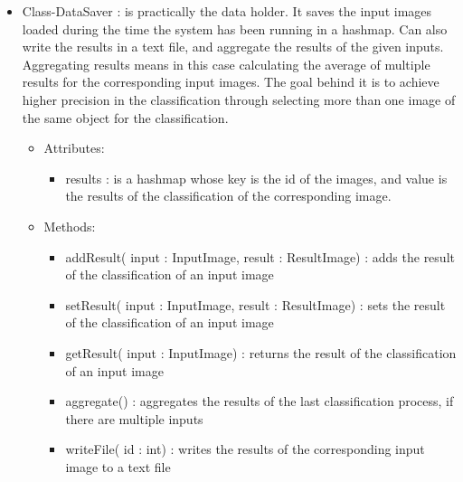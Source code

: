 \documentclass[parskip=full]{scrartcl}
\begin{document}
\begin{itemize}
	\item Class-DataSaver : is practically the data holder. It saves the input images loaded during the time the system has been running in a hashmap. Can also write the results in a text file, and aggregate the results of the given inputs. Aggregating results means in this case calculating the average of multiple results for the corresponding input images. The goal behind it is to achieve higher precision in the classification through selecting more than one image of the same object for the classification.
	\begin{itemize}
		\item Attributes:
		\begin{itemize}
			\item results : is a hashmap whose key is the id of the images, and value is the results of the classification of the corresponding image.
		\end{itemize}
		\item Methods:
		\begin{itemize}
			\item addResult( input : InputImage, result :  ResultImage) : adds the result of the classification of an input image
			\item setResult( input : InputImage, result : ResultImage) : sets the result of the classification of an input image
			\item getResult( input : InputImage) : returns the result of the classification of an input image 
			\item aggregate() : aggregates the results of the last classification process, if there are multiple inputs  
			\item writeFile( id : int) : writes the results of the corresponding input image to a text file 
		\end{itemize}
	\end{itemize}
\end{itemize}



\pagebreak
\end{document}
